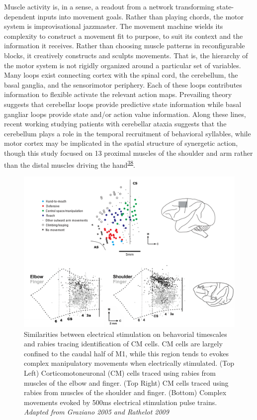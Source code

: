 \documentclass[
  a4paper,
]{article}
\begin{document}
Muscle activity is, in a sense, a readout from a network transforming
state-dependent inputs into movement goals. Rather than playing chords,
the motor system is improvisational jazzmaster. The movement machine
wields its complexity to construct a movement fit to purpose, to suit
its context and the information it receives. Rather than choosing muscle
patterns in reconfigurable blocks, it creatively constructs and sculpts
movements. That is, the hierarchy of the motor system is not rigidly
organized around a particular set of variables. Many loops exist
connecting cortex with the spinal cord, the cerebellum, the basal
ganglia, and the sensorimotor periphery. Each of these loops contributes
information to flexible activate the relevant action maps. Prevailing
theory suggests that cerebellar loops provide predictive state
information while basal gangliar loops provide state and/or action value
information. Along these lines, recent working studying patients with
cerebellar ataxia suggests that the cerebellum plays a role in the
temporal recruitment of behavioral syllables, while motor cortex may be
implicated in the spatial structure of synergetic action, though this
study focused on 13 proximal muscles of the shoulder and arm rather than
the distal muscles driving the
hand\textsuperscript{\protect\hyperlink{ref-bergerDoesCerebellumShape2020}{38}}.

\begin{figure}
\hypertarget{fig:rathelot_graziano}{%
\centering
\includegraphics{images/physiology/strick_graziano/strick_graziano.pdf}
\caption{Similarities between electrical stimulation on behavorial
timescales and rabies tracing identification of CM cells. CM cells are
largely confined to the caudal half of M1, while this region tends to
evokes complex manipulatory movements when electrically stimulated. (Top
Left) Corticomotoneuronal (CM) cells traced using rabies from muscles of
the elbow and finger. (Top Right) CM cells traced using rabies from
muscles of the shoulder and finger. (Bottom) Complex movements evoked by
500ms electrical stimulation pulse trains. \emph{Adapted from Graziano
2005 and Rathelot 2009}}\label{fig:rathelot_graziano}
}
\end{figure}
\end{document}

